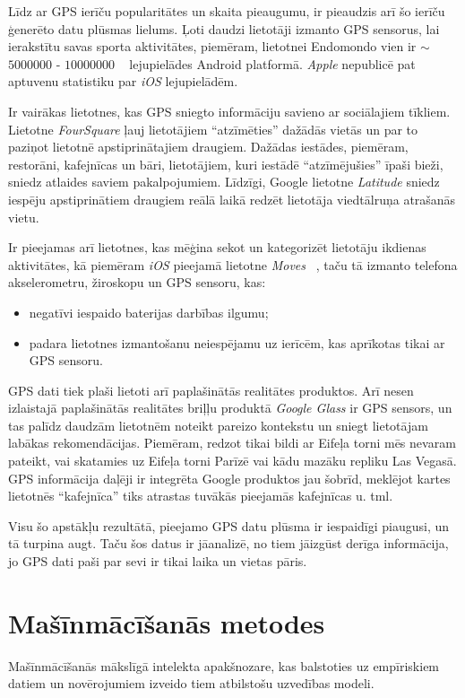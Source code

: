 \documentclass{ludis}
\begin{document}
Līdz ar GPS ierīču popularitātes un skaita pieaugumu, ir pieaudzis arī šo ierīču ģenerēto datu
plūsmas lielums. Ļoti daudzi lietotāji izmanto GPS sensorus, lai ierakstītu savas sporta aktivitātes,
piemēram, lietotnei Endomondo vien ir $\sim$ $5000000$ - $10000000$ ~\cite{g_play_endomondo} 
lejupielādes Android platformā. \emph{Apple} nepublicē pat aptuvenu statistiku par \emph{iOS}
lejupielādēm.

Ir vairākas lietotnes, kas GPS sniegto informāciju savieno ar sociālajiem tīkliem. Lietotne 
\emph{FourSquare} ļauj lietotājiem ``atzīmēties'' dažādās vietās un par to paziņot lietotnē
\linebreak apstiprinātajiem draugiem. Dažādas iestādes, piemēram, restorāni, kafejnīcas un bāri, 
lieto\-tājiem, kuri iestādē ``atzīmējušies'' īpaši bieži, sniedz atlaides saviem pakalpojumiem. 
Līdzīgi, Google lietotne \emph{Latitude} sniedz iespēju apstiprinātiem draugiem reālā laikā redzēt
lietotāja viedtālruņa atrašanās vietu.

Ir pieejamas arī lietotnes, kas mēģina sekot un kategorizēt lietotāju ikdienas 
aktivitātes, kā piemēram \emph{iOS} pieejamā lietotne \emph{Moves} ~\cite{moves_app}, taču tā 
izmanto telefona akselerometru, žiroskopu un GPS sensoru, kas:
\begin{itemize}
\item negatīvi iespaido baterijas darbības ilgumu;
\item padara lietotnes izmantošanu neiespējamu uz ierīcēm, kas aprīkotas tikai ar GPS sensoru.
\end{itemize}

GPS dati tiek plaši lietoti arī paplašinātās realitātes produktos. Arī nesen izlaistajā papla\-šinātās
realitātes briļļu produktā \emph{Google Glass} ir GPS sensors, un tas palīdz daudzām lietotnēm
noteikt pareizo kontekstu un sniegt lietotājam labākas rekomendācijas. Piemēram, redzot tikai bildi
ar Eifeļa torni mēs nevaram pateikt, vai skatamies uz Eifeļa torni Parīzē vai kādu mazāku repliku
Las Vegasā. GPS informācija daļēji ir integrēta Google produktos jau šobrīd, meklējot kartes
lietotnēs ``kafejnīca'' tiks atrastas tuvākās pieejamās kafejnīcas u. tml.

Visu šo apstākļu rezultātā, pieejamo GPS datu plūsma ir iespaidīgi piaugusi, un tā turpina augt.
Taču šos datus ir jāanalizē, no tiem jāizgūst derīga informācija, jo GPS dati paši par sevi ir
tikai laika un vietas pāris.

\section{Mašīnmācīšanās metodes}
Mašīnmācīšanās mākslīgā intelekta apakšnozare, kas balstoties uz empīriskiem datiem un novērojumiem
izveido tiem atbilstošu uzvedības modeli. 
\end{document}
